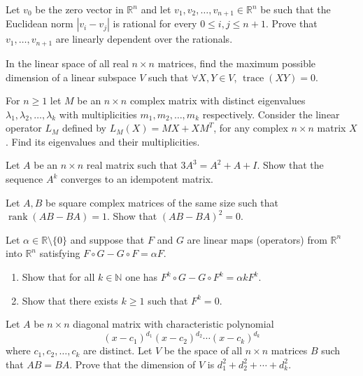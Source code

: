 \documentclass[12pt]{article}
\begin{document}
\begin{problem}
Let $v_0$ be the zero vector in $\mathbb{R}^n$ and let $v_1,v_2,\dots,v_{n+1}\in\mathbb{R}^n$ be such that the Euclidean norm $|v_i-v_j|$ is rational for every $0\le i,j\le n+1$. Prove that $v_1,\dots,v_{n+1}$ are linearly dependent over the rationals.
\end{problem}

\begin{problem}
In the linear space of all real $n\times n$ matrices, find the maximum possible dimension of a linear subspace $V$ such that $\forall X,Y\in V$, $\operatorname{trace}(XY)=0$.
\end{problem}

\begin{problem}
For $n\ge 1$ let $M$ be an $n\times n$ complex matrix with distinct eigenvalues $\lambda_1,\lambda_2,\dots,\lambda_k$ with multiplicities $m_1,m_2,\dots,m_k$ respectively. Consider the linear operator $L_M$ defined by $L_M(X)=MX+XM^T$, for any complex $n\times n$ matrix $X$. Find its eigenvalues and their multiplicities.
\end{problem}

\begin{problem}
Let $A$ be an $n\times n$ real matrix such that $3A^3 = A^2+A+I$. Show that the sequence $A^k$ converges to an idempotent matrix.
\end{problem}

\begin{problem}
Let $A,B$ be square complex matrices of the same size such that $\operatorname{rank}(AB-BA)=1$. Show that $(AB-BA)^2=0$.
\end{problem}

\begin{problem}
Let $\alpha\in\mathbb{R}\setminus\{0\}$ and suppose that $F$ and $G$ are linear maps (operators) from $\mathbb{R}^n$ into $\mathbb{R}^n$ satisfying $F\circ G - G\circ F = \alpha F$.
\begin{enumerate}[label=(\alph*)]
\item Show that for all $k\in\mathbb{N}$ one has $F^k\circ G - G\circ F^k = \alpha k F^k$.
\item Show that there exists $k\ge 1$ such that $F^k=0$.
\end{enumerate}
\end{problem}

\begin{problem}
Let $A$ be $n\times n$ diagonal matrix with characteristic polynomial
\[
(x-c_1)^{d_1}(x-c_2)^{d_2}\cdots(x-c_k)^{d_k}
\]
where $c_1,c_2,\dots,c_k$ are distinct. Let $V$ be the space of all $n\times n$ matrices $B$ such that $AB=BA$. Prove that the dimension of $V$ is $d_1^2+d_2^2+\cdots+d_k^2$.
\end{problem}
\end{document}
